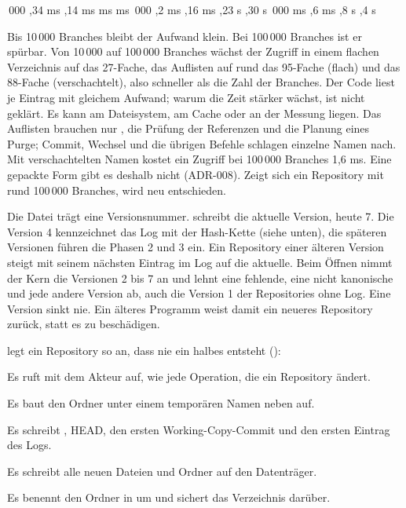 \startxtable
\startxrow
{} \stopxcell
{} \stopxcell
{} \stopxcell
{} \stopxcell
{} \stopxcell
\stopxrow
\startxrow
{}\,000 \stopxcell
{},34 ms \stopxcell
{},14 ms \stopxcell
{} ms \stopxcell
{} ms \stopxcell
\stopxrow
\startxrow
{}\,000 \stopxcell
{},2 ms \stopxcell
{},16 ms \stopxcell
{},23 s \stopxcell
{},30 s \stopxcell
\stopxrow
\startxrow
{}\,000 \stopxcell
{} ms \stopxcell
{},6 ms \stopxcell
{},8 s \stopxcell
{},4 s \stopxcell
\stopxrow
\stopxtable

Bis 10\,000 Branches bleibt der Aufwand klein. Bei 100\,000 Branches ist er spürbar.
Von 10\,000 auf 100\,000 Branches wächst der Zugriff in einem flachen Verzeichnis auf das
27-Fache, das Auflisten auf rund das 95-Fache (flach) und das 88-Fache (verschachtelt),
also schneller als die Zahl der Branches.
Der Code liest je Eintrag mit gleichem Aufwand; warum die Zeit stärker wächst,
ist nicht geklärt. Es kann am Dateisystem, am Cache oder an der Messung liegen.
Das Auflisten brauchen nur , die Prüfung der Referenzen und die Planung eines
Purge; Commit, Wechsel und die übrigen Befehle schlagen einzelne Namen nach.
Mit verschachtelten Namen kostet ein Zugriff bei 100\,000 Branches 1,6 ms.
Eine gepackte Form gibt es deshalb nicht (ADR-008).
Zeigt sich ein Repository mit rund 100\,000 Branches, wird neu entschieden.

Die Datei  trägt eine Versionsnummer.
 schreibt die aktuelle Version, heute 7.
Die Version 4 kennzeichnet das Log mit der Hash-Kette (siehe unten),
die späteren Versionen führen die Phasen 2 und 3 ein.
Ein Repository einer älteren Version steigt mit seinem nächsten Eintrag im Log auf die aktuelle.
Beim Öffnen nimmt der Kern die Versionen 2 bis 7 an und lehnt eine fehlende,
eine nicht kanonische und jede andere Version ab, auch die
Version 1 der Repositories ohne Log. Eine Version sinkt nie.
Ein älteres Programm weist damit ein neueres Repository zurück, statt es zu beschädigen.

 legt ein Repository so an, dass nie ein halbes entsteht
():

\startitemize[n]
\item Es ruft  mit dem Akteur auf,
wie jede Operation, die ein Repository ändert.
\item Es baut den Ordner unter einem temporären Namen neben  auf.
\item Es schreibt , HEAD, den ersten Working-Copy-Commit und den ersten Eintrag
des Logs.
\item Es schreibt alle neuen Dateien und Ordner auf den Datenträger.
\item Es benennt den Ordner in  um und sichert das Verzeichnis darüber.
\stopitemize

